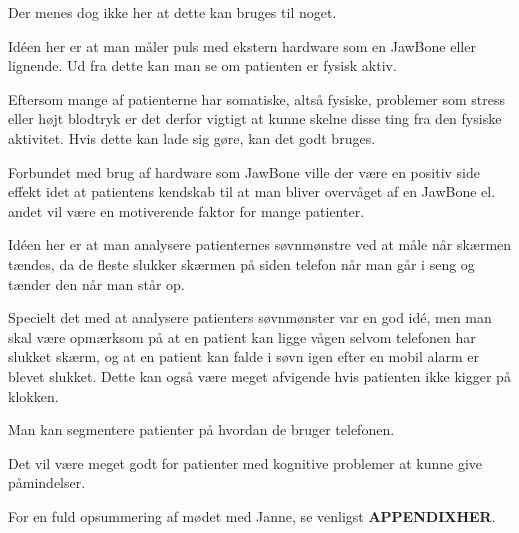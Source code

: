 \begin{description}[style=nextline]
	Der menes dog ikke her at dette kan bruges til noget.
\item[Puls]
	Idéen her er at man måler puls med ekstern hardware som en JawBone eller lignende. Ud fra dette kan man se om patienten er fysisk aktiv.
	
	Eftersom mange af patienterne har somatiske, altså fysiske, problemer som stress eller højt blodtryk er det derfor vigtigt at kunne skelne disse ting fra den fysiske aktivitet.
	Hvis dette kan lade sig gøre, kan det godt bruges. 
	
	Forbundet med brug af hardware som JawBone ville der være en positiv side effekt idet at patientens kendskab til at man bliver overvåget af en JawBone el. andet vil være en motiverende faktor for mange patienter. 
\item[Søvnmønstre]
	Idéen her er at man analysere patienternes søvnmønstre ved at måle når skærmen tændes, da de fleste slukker skærmen på siden telefon når man går i seng og tænder den når man står op. 
	
	Specielt det med at analysere patienters søvnmønster var en god idé, men man skal være opmærksom på at en patient kan ligge vågen selvom telefonen har slukket skærm, og at en patient kan falde i søvn igen efter en mobil alarm er blevet slukket.
	Dette kan også være meget afvigende hvis patienten ikke kigger på klokken.
\item[Galvanisk hud respons]
	
\item[Andre]
	Man kan segmentere patienter på hvordan de bruger telefonen.
	
	Det vil være meget godt for patienter med kognitive problemer at kunne give påmindelser. 
	
	
\end{description}


For en fuld opsummering af mødet med Janne, se venligst \textbf{APPENDIXHER}.